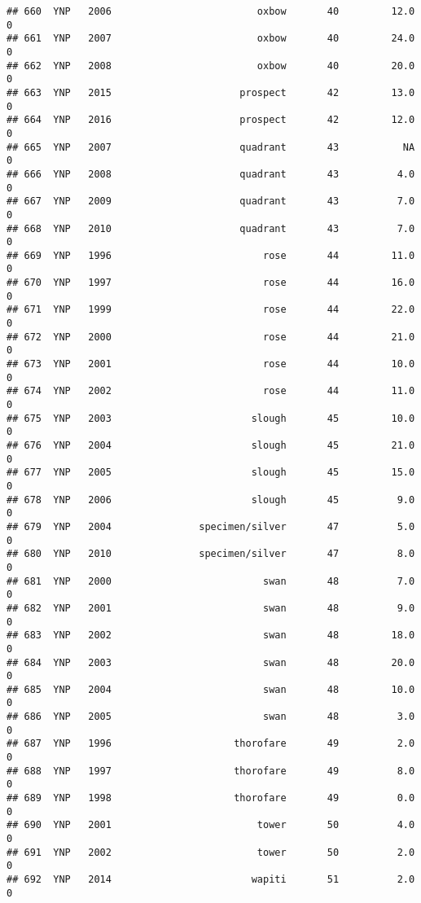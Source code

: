 \documentclass[
]{article}
\begin{document}
\begin{verbatim}
## 660  YNP   2006                         oxbow       40         12.0       0
## 661  YNP   2007                         oxbow       40         24.0       0
## 662  YNP   2008                         oxbow       40         20.0       0
## 663  YNP   2015                      prospect       42         13.0       0
## 664  YNP   2016                      prospect       42         12.0       0
## 665  YNP   2007                      quadrant       43           NA       0
## 666  YNP   2008                      quadrant       43          4.0       0
## 667  YNP   2009                      quadrant       43          7.0       0
## 668  YNP   2010                      quadrant       43          7.0       0
## 669  YNP   1996                          rose       44         11.0       0
## 670  YNP   1997                          rose       44         16.0       0
## 671  YNP   1999                          rose       44         22.0       0
## 672  YNP   2000                          rose       44         21.0       0
## 673  YNP   2001                          rose       44         10.0       0
## 674  YNP   2002                          rose       44         11.0       0
## 675  YNP   2003                        slough       45         10.0       0
## 676  YNP   2004                        slough       45         21.0       0
## 677  YNP   2005                        slough       45         15.0       0
## 678  YNP   2006                        slough       45          9.0       0
## 679  YNP   2004               specimen/silver       47          5.0       0
## 680  YNP   2010               specimen/silver       47          8.0       0
## 681  YNP   2000                          swan       48          7.0       0
## 682  YNP   2001                          swan       48          9.0       0
## 683  YNP   2002                          swan       48         18.0       0
## 684  YNP   2003                          swan       48         20.0       0
## 685  YNP   2004                          swan       48         10.0       0
## 686  YNP   2005                          swan       48          3.0       0
## 687  YNP   1996                     thorofare       49          2.0       0
## 688  YNP   1997                     thorofare       49          8.0       0
## 689  YNP   1998                     thorofare       49          0.0       0
## 690  YNP   2001                         tower       50          4.0       0
## 691  YNP   2002                         tower       50          2.0       0
## 692  YNP   2014                        wapiti       51          2.0       0

\end{verbatim}
\end{document}
